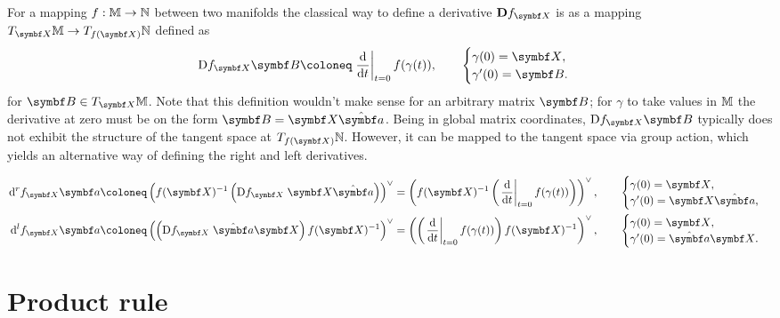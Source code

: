 For a mapping $f : \mathbb{M} \rightarrow \mathbb{N}$ between two manifolds the classical way to define a derivative $\mathbf{D} f_\X$ is as a mapping $T_\X \M \rightarrow T_{f(\X)} \N$ defined as
\begin{equation}
  \mathrm{D} f_\X \B \coloneq \left. \frac{\mathrm{d}}{\mathrm{d}t} \right|_{t = 0} f(\gamma(t)), \qquad \begin{cases}
    \gamma(0) = \X, \\
    \gamma'(0) = \B.
  \end{cases}
\end{equation}
for $\B \in T_\X \M$. Note that this definition wouldn't make sense for an arbitrary matrix $\B$; for $\gamma$ to take values in $\mathbb{M}$ the derivative at zero must be on the form $\B = \X \hat \a$. Being in global matrix coordinates, $\mathrm{D} f_\X \B$ typically does not exhibit the structure of the tangent space at $T_{f(\X)} \N$. However, it can be mapped to the tangent space via group action, which yields an alternative way of defining the right and left derivatives.

\begin{equation}
  \label{eq:rght_deriv_traditional}
  \begin{aligned}
    \mathrm{d}^r f_\X \a & \coloneq \left( f(\X)^{-1} \left( \mathrm{D} f_\X \; \X \hat \a \right) \right)^{\vee} = \left( f(\X)^{-1} \left( \left. \frac{\mathrm{d}}{\mathrm{d}t} \right|_{t = 0} f(\gamma(t)) \right) \right)^\vee, \qquad \begin{cases} \gamma(0) = \X, \\ \gamma'(0) = \X \hat \a, \end{cases}  \\
    \mathrm{d}^l f_\X \a & \coloneq \left( \left( \mathrm{D} f_\X \; \hat \a \X \right) f(\X)^{-1} \right)^{\vee} = \left( \left( \left. \frac{\mathrm{d}}{\mathrm{d}t} \right|_{t = 0} f(\gamma(t)) \right) f(\X)^{-1}  \right)^\vee, \qquad \begin{cases} \gamma(0) = \X, \\ \gamma'(0) = \hat \a \X. \end{cases}
  \end{aligned}
\end{equation}


\section{Product rule}

